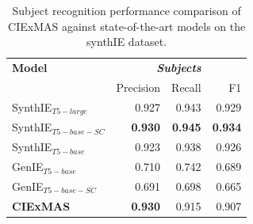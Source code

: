 \documentclass[a4paper,oneside,bibliography=totoc]{scrbook}
\begin{document}
\begin{table}[h]
  \centering
  \begin{tabular}{l|rrr}
    \toprule
    \textbf{Model}         & \multicolumn{3}{c}{\textit{\textbf{Subjects}}}                                   \\
                           & Precision                                      & Recall         & F1             \\
    \midrule
    SynthIE$_{T5-large}$   & 0.927                                          & 0.943          & 0.929          \\
    SynthIE$_{T5-base-SC}$ & \textbf{0.930}                                 & \textbf{0.945} & \textbf{0.934} \\
    SynthIE$_{T5-base}$    & 0.923                                          & 0.938          & 0.926          \\
    GenIE$_{T5-base}$      & 0.710                                          & 0.742          & 0.689          \\
    GenIE$_{T5-base-SC}$   & 0.691                                          & 0.698          & 0.665          \\
    \midrule
    \textbf{CIExMAS}       & \textbf{0.930}                                 & 0.915          & 0.907          \\
    \bottomrule
  \end{tabular}
  \caption{Subject recognition performance comparison of CIExMAS against state-of-the-art models on the synthIE dataset.}
  \label{tab:evaluation_subjects}
\end{table}
\end{document}

